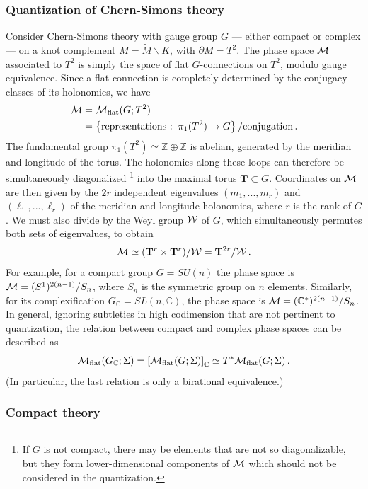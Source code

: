 \documentclass[letterpaper,12pt]{article}
\numberwithin{equation}{section}
\newcommand{\mb}{\mathbf}
\newcommand{\be}{\begin{equation}}
\newcommand{\ee}{\end{equation}}
\newcommand{\pd}{\partial}
\newcommand{\bs}{\backslash}
\newcommand{\C}{{\mathbb{C}}}
\newcommand{\Z}{{\mathbb{Z}}}
\newcommand{\CM}{{\cal M}}
\newcommand{\CW}{{\cal W}}
\renewcommand{\=}{\;=\;}
\begin{document}
\subsubsection{Quantization of Chern-Simons theory}
\label{sec:TQFT_CS}


Consider Chern-Simons theory with gauge group $G$ --- either compact or complex --- on a knot complement $M = \widetilde{M}\bs K$, with $\pd M = T^2$. The phase space $\CM$ associated to $T^2$ is simply the space of flat $G$-connections on $T^2$, modulo gauge equivalence. Since a flat connection is completely determined by the conjugacy classes of its holonomies, we have
%
\begin{align} \CM &= \CM_{{\rm flat}} (G;T^2) \\
 &= \left\{ \text{representations :}\;\;\pi_1(T^2)\to G \right\}/\text{conjugation}\,.
\end{align}
%
The fundamental group $\pi_1(T^2)\simeq \Z\oplus\Z$ is abelian, generated by the meridian and longitude of the torus. The holonomies along these loops can therefore be simultaneously diagonalized%
\footnote{If $G$ is not compact, there may be elements that are not so diagonalizable, but they form lower-dimensional components of $\CM$ which should not be considered in the quantization.} %
%
into the maximal torus $\mb{T}\subset G$. Coordinates on $\CM$ are then given by the $2r$ independent eigenvalues $(m_1,...,m_r)$ and $(\ell_1,...,\ell_r)$ of the meridian and longitude holonomies, where $r$ is the rank of $G$. We must also divide by the Weyl group $\CW$ of $G$, which simultaneously permutes both sets of eigenvalues, to obtain
%
\be \CM \simeq (\mb{T}^r\times \mb{T}^r)/\CW = \mb{T}^{2r}/\CW\,. \ee
%
For example, for a compact group $G = SU(n)$
the phase space is $\CM = (S^1)^{2(n-1)}/S_n$,
where $S_n$ is the symmetric group on $n$ elements.
Similarly, for its complexification $G_\C = SL(n,\C)$, the phase space is $\CM = (\C^*)^{2(n-1)}/S_n$.
In general, ignoring subtleties in high codimension that are not pertinent to quantization,
the relation between compact and complex phase spaces can be described as
%
\be \CM_{{\rm flat}} (G_\C;\Sigma) = \left[\CM_{{\rm flat}} (G;\Sigma)\right]_\C \simeq T^*\CM_{{\rm flat}} (G;\Sigma)\,. \ee
%
(In particular, the last relation is only a birational equivalence.)


\subsubsection*{Compact theory}
\end{document}
